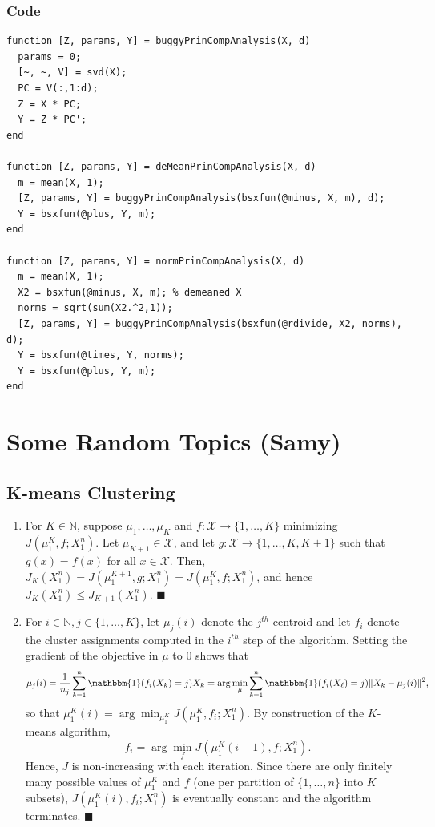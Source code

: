 \documentclass[11pt]{article}
\renewcommand{\qed}{\quad \ensuremath{\blacksquare}}
\newcommand{\N}{\mathbb{N}} %
\newcommand{\X}{\mathcal{X}}
\begin{document}
\newpage
\subsubsection*{Code}
\begin{verbatim}
function [Z, params, Y] = buggyPrinCompAnalysis(X, d)
  params = 0;
  [~, ~, V] = svd(X);
  PC = V(:,1:d);
  Z = X * PC;
  Y = Z * PC';
end

function [Z, params, Y] = deMeanPrinCompAnalysis(X, d)
  m = mean(X, 1);
  [Z, params, Y] = buggyPrinCompAnalysis(bsxfun(@minus, X, m), d);
  Y = bsxfun(@plus, Y, m);
end

function [Z, params, Y] = normPrinCompAnalysis(X, d)
  m = mean(X, 1);
  X2 = bsxfun(@minus, X, m); % demeaned X
  norms = sqrt(sum(X2.^2,1));
  [Z, params, Y] = buggyPrinCompAnalysis(bsxfun(@rdivide, X2, norms), d);
  Y = bsxfun(@times, Y, norms);
  Y = bsxfun(@plus, Y, m);
end
\end{verbatim}

\section{Some Random Topics (Samy)}
\subsection{K-means Clustering}
\begin{enumerate}
\item 
For $K \in \N$, suppose $\mu_1,\dots,\mu_K$ and $f : \X \to \{1,\dots,K\}$
minimizing $J(\mu_1^K, f; X_1^n)$. Let $\mu_{K + 1} \in \X$, and let
$g : \X \to \{1,\dots,K,K + 1\}$ such that $g(x) = f(x)$ for all $x \in \X$.
Then, $J_K(X_1^n) = J(\mu_1^{K + 1}, g; X_1^n) = J(\mu_1^K, f; X_1^n)$, and
hence $J_K(X_1^n) \leq J_{K + 1}(X_1^n)$. \qed

\item For $i \in \N, j \in \{1,\dots,K\}$, let $\mu_j(i)$ denote the $j^{th}$
centroid and let $f_i$ denote the cluster assignments computed in the $i^{th}$
step of the algorithm. Setting the gradient of the objective in $\mu$ to $0$
shows that
\[\mu_j(i)
    = \frac{1}{n_j} \sum_{k = 1}^n \mathbbm{1}(f_i(X_k) = j) X_k
    = \arg\min_{\mu} \sum_{k = 1}^n
        \mathbbm{1}(f_i(X_\ell) = j) \|X_k - \mu_j(i)\|^2,
\]
so that $\mu_1^K(i) = \arg\min_{\mu_1^K} J(\mu_1^K,f_i;X_1^n)$. By
construction of the $K$-means algorithm,
\[f_i = \arg\min_f J(\mu_1^K(i - 1), f; X_1^n).\]
Hence, $J$ is non-increasing with each iteration. Since there are only finitely
many possible values of $\mu_1^K$ and $f$ (one per partition of $\{1,\dots,n\}$
into $K$ subsets), $J(\mu_1^K(i), f_i; X_1^n)$ is eventually constant and the
algorithm terminates. \qed
\end{enumerate}
\end{document}
